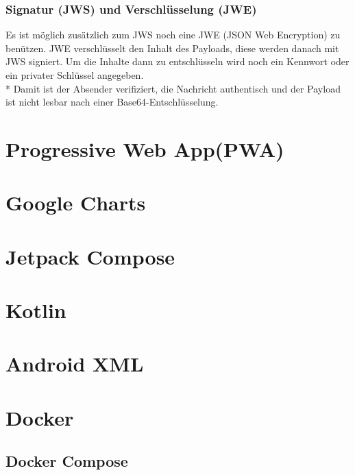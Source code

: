 \subsubsection{Signatur (JWS) und Verschlüsselung (JWE)}
Es ist möglich zusätzlich zum JWS noch eine JWE (JSON Web Encryption) zu benützen. JWE verschlüsselt den Inhalt des Payloads, diese werden danach mit JWS signiert.
Um die Inhalte dann zu entschlüsseln wird noch ein Kennwort oder ein privater Schlüssel angegeben. \\*
Damit ist der Absender verifiziert, die Nachricht authentisch und der Payload ist nicht lesbar nach einer Base64-Entschlüsselung. \cite{JWTIONOS}
\section{Progressive Web App(PWA)}

\section{Google Charts}

\section{Jetpack Compose}

\section{Kotlin}

\section{Android XML}


\section{Docker}
\subsection{Docker Compose}
